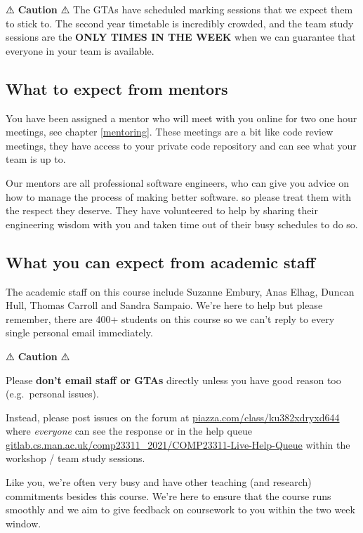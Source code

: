 \documentclass[
]{book}
\begin{document}
⚠️ \textbf{Caution} ⚠️
The GTAs have scheduled marking sessions that we expect them to stick to. The second year timetable is incredibly crowded, and the team study sessions are the \textbf{ONLY TIMES IN THE WEEK} when we can guarantee that everyone in your team is available.

\hypertarget{gomentors}{%
\subsection{What to expect from mentors}\label{gomentors}}

You have been assigned a mentor who will meet with you online for two one hour meetings, see chapter \ref{mentoring}. These meetings are a bit like code review meetings, they have access to your private code repository and can see what your team is up to.

Our mentors are all professional software engineers, who can give you advice on how to manage the process of making better software. so please treat them with the respect they deserve. They have volunteered to help by sharing their engineering wisdom with you and taken time out of their busy schedules to do so.

\hypertarget{academics}{%
\subsection{What you can expect from academic staff}\label{academics}}

The academic staff on this course include Suzanne Embury, Anas Elhag, Duncan Hull, Thomas Carroll and Sandra Sampaio. We're here to help but please remember, there are 400+ students on this course so we can't reply to every single personal email immediately.

⚠️ \textbf{Caution} ⚠️

Please \textbf{don't email staff or GTAs} directly unless you have good reason too (e.g.~personal issues).

Instead, please post issues on the forum at \href{https://piazza.com/class/ku382xdryxd644}{piazza.com/class/ku382xdryxd644} where \emph{everyone} can see the response or in the help queue \href{https://gitlab.cs.man.ac.uk/comp23311_2021/COMP23311-Live-Help-Queue/}{gitlab.cs.man.ac.uk/comp23311\_2021/COMP23311-Live-Help-Queue} within the workshop / team study sessions.

Like you, we're often very busy and have other teaching (and research) commitments besides this course. We're here to ensure that the course runs smoothly and we aim to give feedback on coursework to you within the two week window.
\end{document}
